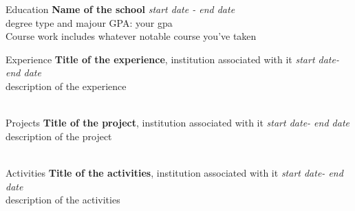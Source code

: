 \documentclass{resume} %
\begin{document}

\begin{rSection}{Education}
{\bf Name of the school} \hfill {\em start date - end date} 
\\ degree type and majour\hfill { GPA: your gpa }
\\ Course work includes whatever notable course you've taken
\\

\end{rSection}
\begin{rSection}{Experience}
{\bf Title of the experience}{, institution associated with it} \hfill {\em start date- end date}\\
description of the experience\\\\
\end{rSection}
\begin{rSection}{Projects}
{\bf Title of the project}{, institution associated with it} \hfill {\em start date- end date}\\
description of the project\\\\
\end{rSection}
\begin{rSection}{Activities}
{\bf Title of the activities}{, institution associated with it} \hfill {\em start date- end date}\\
description of the activities\\\\
\end{rSection}
\end{document}

